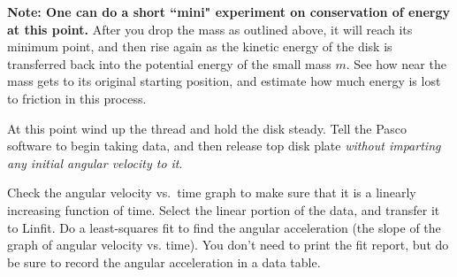 {\bf Note:  One can do a short ``mini" experiment on conservation of
energy at this point.}  After you drop the mass as outlined above, it
will reach its minimum point, and then rise again as the kinetic
energy of the disk is transferred back into the potential energy of
the small mass $m$.  See how near the mass gets to its original
starting position, and estimate how much energy is lost to friction in
this process.


At this point wind up the thread and hold the disk steady.
Tell the Pasco
software to begin taking data, and then release top disk
plate {\em without imparting any initial angular velocity to it}.


 Check the angular velocity vs.\ time graph to make
sure that it is a linearly increasing function of time.  Select the
linear portion of the data, and transfer it to Linfit.  Do a
least-squares fit to find the angular acceleration (the slope of the
graph of angular velocity vs. time).  You don't need to print the fit
report, but do be sure to record the angular acceleration in a data
table.

